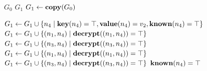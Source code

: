 \documentclass[]{article}
\begin{document}
\begin{algorithm}
    \caption{Decrypt}
    \begin{algorithmic}
        \Require $G_0$
        \Ensure $G_1$
        \State $G_1 \gets \textbf{copy}(G_0)$



        \State $G_1 \gets G_1 \cup \{ n_4 \mid \textbf{key}(n_4) = \top, \textbf{value}(n_4) = v_2, \textbf{known}(n_4) = \top \}$
        \State $G_1 \gets G_1 \cup \{ (n_1,n_4) \mid \textbf{decrypt}((n_1,n_4)) = \top \}$
        \State $G_1 \gets G_1 \cup \{ (n_3,n_4) \mid \textbf{decrypt}((n_3,n_4)) = \top \}$
        \Else
        \State $G_1 \gets G_1 \cup \{ (n_1,n_4) \mid \textbf{decrypt}((n_1,n_4)) = \top \}$
        \State $G_1 \gets G_1 \cup \{ (n_3,n_4) \mid \textbf{decrypt}((n_3,n_4)) = \top \}$
        \EndIf
        \State $\textbf{known}(n_4) = \top$
        \EndIf
        \EndIf
        \EndFor
        \EndFor
    \end{algorithmic}
\end{algorithm}
\end{document}
